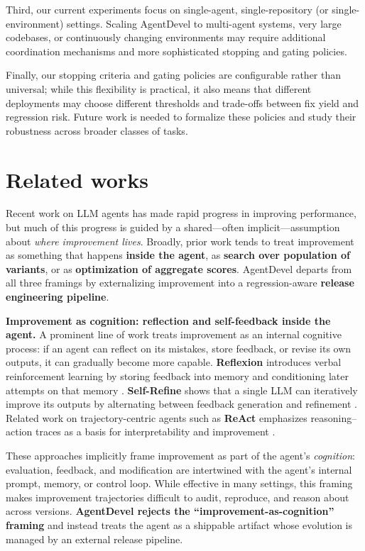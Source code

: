 \documentclass[11pt]{article}
\begin{document}
Third, our current experiments focus on single-agent, single-repository (or single-environment) settings. Scaling AgentDevel to multi-agent systems, very large codebases, or continuously changing environments may require additional coordination mechanisms and more sophisticated stopping and gating policies.

Finally, our stopping criteria and gating policies are configurable rather than universal; while this flexibility is practical, it also means that different deployments may choose different thresholds and trade-offs between fix yield and regression risk. Future work is needed to formalize these policies and study their robustness across broader classes of tasks.

\section{Related works}
Recent work on LLM agents has made rapid progress in improving performance, but much of this progress is guided by a shared—often implicit—assumption about \textit{where improvement lives}. Broadly, prior work tends to treat improvement as something that happens \textbf{inside the agent}, as \textbf{search over population of variants}, or as \textbf{optimization of aggregate scores}. AgentDevel departs from all three framings by externalizing improvement into a regression-aware \textbf{release engineering pipeline}.

\textbf{Improvement as cognition: reflection and self-feedback inside the agent.} A prominent line of work treats improvement as an internal cognitive process: if an agent can reflect on its mistakes, store feedback, or revise its own outputs, it can gradually become more capable. \textbf{Reflexion} introduces verbal reinforcement learning by storing feedback into memory and conditioning later attempts on that memory \cite{shinn2023reflexion}. \textbf{Self-Refine} shows that a single LLM can iteratively improve its outputs by alternating between feedback generation and refinement \cite{madaan2023selfrefine}. Related work on trajectory-centric agents such as \textbf{ReAct} emphasizes reasoning–action traces as a basis for interpretability and improvement \cite{yao2022react}.

These approaches implicitly frame improvement as part of the agent’s \textit{cognition}: evaluation, feedback, and modification are intertwined with the agent’s internal prompt, memory, or control loop. While effective in many settings, this framing makes improvement trajectories difficult to audit, reproduce, and reason about across versions. \textbf{AgentDevel rejects the “improvement-as-cognition” framing} and instead treats the agent as a shippable artifact whose evolution is managed by an external release pipeline.
\end{document}
